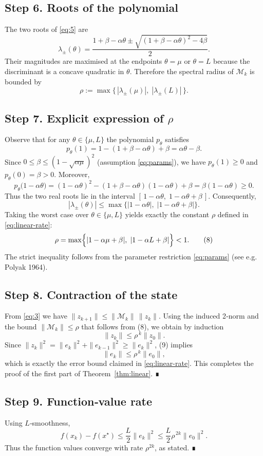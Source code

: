 \documentclass[11pt]{article}
\begin{document}
\subsection*{Step 6.  Roots of the polynomial}
The two roots of \eqref{eq:5} are
\[
\lambda_{\pm}(\theta)=\frac{1+\beta-\alpha\theta\pm\sqrt{(1+\beta-\alpha\theta)^2-4\beta}}{2}.
\tag{6}
\]
Their magnitudes are maximised at the endpoints $\theta=\mu$ or $\theta=L$ because the discriminant is a concave quadratic in $\theta$.  Therefore the spectral radius of $\mathcal{M}_k$ is bounded by
\[
\rho:=\max\bigl\{\,|\lambda_{\pm}(\mu)|,\;|\lambda_{\pm}(L)|\,\bigr\}.
\tag{7}
\]

\subsection*{Step 7.  Explicit expression of $\rho$}
Observe that for any $\theta\in\{\mu,L\}$ the polynomial $p_\theta$ satisfies
\[
p_\theta(1)=1-(1+\beta-\alpha\theta)+\beta = \alpha\theta- \beta .
\]
Since $0\le\beta\le(1-\sqrt{\alpha\mu})^2$ (assumption \eqref{eq:params}), we have $p_\theta(1)\ge0$ and $p_\theta(0)=\beta>0$.  Moreover,
\[
p_\theta\bigl(1-\alpha\theta\bigr)= (1-\alpha\theta)^2-(1+\beta-\alpha\theta)(1-\alpha\theta)+\beta
= \beta(1-\alpha\theta)\ge0 .
\]
Thus the two real roots lie in the interval $[\,1-\alpha\theta,\;1-\alpha\theta+\beta\,]$.  Consequently,
\[
|\lambda_{\pm}(\theta)|\le \max\bigl\{|1-\alpha\theta|,\;|1-\alpha\theta+\beta|\bigr\}.
\]
Taking the worst case over $\theta\in\{\mu,L\}$ yields exactly the constant $\rho$ defined in \eqref{eq:linear-rate}:
\[
\rho=\max\Bigl\{|1-\alpha\mu+\beta|,\;|1-\alpha L+\beta|\Bigr\}<1 .
\tag{8}
\]
The strict inequality follows from the parameter restriction \eqref{eq:params} (see e.g. Polyak 1964).

\subsection*{Step 8.  Contraction of the state}
From \eqref{eq:3} we have $\|z_{k+1}\|\le \|\mathcal{M}_k\|\,\|z_k\|$.  Using the induced 2‑norm and the bound $\|\mathcal{M}_k\|\le\rho$ that follows from (8), we obtain by induction
\[
\|z_k\|\le\rho^{\,k}\|z_0\|.
\tag{9}
\]
Since $\|z_k\|^2=\|e_k\|^2+\|e_{k-1}\|^2\ge\|e_k\|^2$, (9) implies
\[
\|e_k\|\le\rho^{\,k}\|e_0\|,
\]
which is exactly the error bound claimed in \eqref{eq:linear-rate}.  This completes the proof of the first part of Theorem~\ref{thm:linear}.  ∎

\subsection*{Step 9.  Function‑value rate}
Using $L$‑smoothness,
\[
f(x_k)-f(x^\star)\le \frac{L}{2}\|e_k\|^2
\le \frac{L}{2}\rho^{\,2k}\|e_0\|^2 .
\]
Thus the function values converge with rate $\rho^{2k}$, as stated.  ∎
\end{document}
